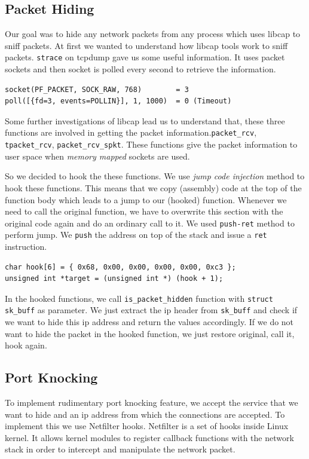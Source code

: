 \documentclass[10pt, letterpaper]{scrartcl}
\begin{document}
\subsection{Packet Hiding}
Our goal was to hide any network packets from any process which uses libcap to  sniff packets.
At first we wanted to understand how libcap tools work to sniff packets. \texttt{strace} on tcpdump gave us some useful information. It uses packet sockets and then socket is polled every second to retrieve the information.   

\begin{verbatim}
socket(PF_PACKET, SOCK_RAW, 768)        = 3
poll([{fd=3, events=POLLIN}], 1, 1000)  = 0 (Timeout)
\end{verbatim} 

Some further investigations of libcap lead us to understand that, these three functions are involved in getting the packet information.\texttt{packet\_rcv}, \texttt{tpacket\_rcv}, \texttt{packet\_rcv\_spkt}. These functions give the packet information to user space when {\em memory mapped} sockets are used.

So we decided to hook the these functions. 
We use {\em jump code injection} method to hook these functions. This means that we copy (assembly)
code at the top of the function body which leads to a jump to our (hooked) function. Whenever we need to call
the original function, we have to overwrite this section with the original code again and do an ordinary call to
it. We used \texttt{push-ret} method to perform jump. 
We \texttt{push} the address on top of the stack and issue a \texttt{ret} instruction.

\begin{verbatim}
char hook[6] = { 0x68, 0x00, 0x00, 0x00, 0x00, 0xc3 };
unsigned int *target = (unsigned int *) (hook + 1);
\end{verbatim} 

In the hooked functions, we call \texttt{is\_packet\_hidden} function with \texttt{struct sk\_buff} as parameter.
We just extract the ip header from \texttt{sk\_buff} and check if we want to hide this ip address and return the values accordingly. 
If we do not want to hide the packet in the hooked function, we just restore original, call it, hook again. 
  
\subsection{Port Knocking}
To implement rudimentary port knocking feature, we accept the service that we want to hide and an ip address 
from which the connections are accepted. To implement this we use Netfilter hooks. Netfilter is a set of hooks inside Linux kernel. 
It allows kernel modules to register callback functions with the network stack in order to intercept and manipulate the network packet.
\end{document}
